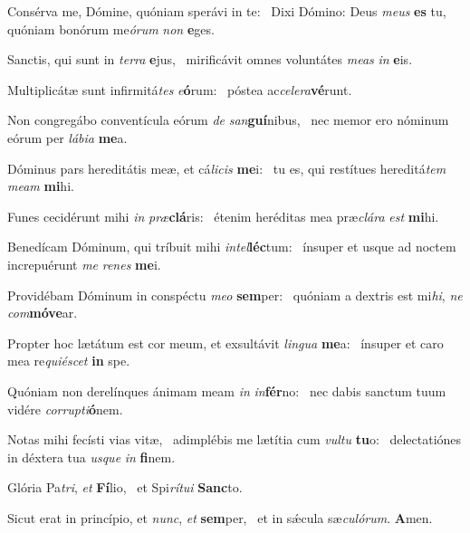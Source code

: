 \item Consérva me, Dómine, quóniam sperávi in te:~\pscross{} Dixi Dómino: Deus \textit{meus} \textbf{es} tu,~\psstar{} quóniam bonórum me\textit{órum} \textit{non} \textbf{e}ges.
\item Sanctis, qui sunt in \textit{terra} \textbf{e}jus,~\psstar{} mirificávit omnes voluntátes \textit{meas} \textit{in} \textbf{e}is.
\item Multiplicátæ sunt infirmitá\textit{tes} \textit{e}\textbf{ó}rum:~\psstar{} póstea ac\textit{celera}\textbf{vé}runt.
\item Non congregábo conventícula eórum \textit{de} \textit{san}\textbf{guí}nibus,~\psstar{} nec memor ero nóminum eórum per \textit{lábia} \textbf{me}a.
\item Dóminus pars hereditátis meæ, et cá\textit{licis} \textbf{me}i:~\psstar{} tu es, qui restítues hereditá\textit{tem} \textit{meam} \textbf{mi}hi.
\item Funes cecidérunt mihi \textit{in} \textit{præ}\textbf{clá}ris:~\psstar{} étenim heréditas mea præ\textit{clára} \textit{est} \textbf{mi}hi.
\item Benedícam Dóminum, qui tríbuit mihi \textit{intel}\textbf{léc}tum:~\psstar{} ínsuper et usque ad noctem increpuérunt \textit{me} \textit{renes} \textbf{me}i.
\item Providébam Dóminum in conspéctu \textit{meo} \textbf{sem}per:~\psstar{} quóniam a dextris est mi\textit{hi}, \textit{ne} \textit{com}\textbf{mó}\textbf{ve}ar.
\item Propter hoc lætátum est cor meum, et exsultávit \textit{lingua} \textbf{me}a:~\psstar{} ínsuper et caro mea re\textit{quiéscet} \textbf{in} spe.
\item Quóniam non derelínques ánimam meam \textit{in} \textit{in}\textbf{fér}no:~\psstar{} nec dabis sanctum tuum vidére \textit{corrupti}\textbf{ó}nem.
\item Notas mihi fecísti vias vitæ,~\pscross{} adimplébis me lætítia cum \textit{vultu} \textbf{tu}o:~\psstar{} delectatiónes in déxtera tua \textit{usque} \textit{in} \textbf{fi}nem.
\item Glória Pa\textit{tri}, \textit{et} \textbf{Fí}lio,~\psstar{} et Spi\textit{rítui} \textbf{Sanc}to.
\item Sicut erat in princípio, et \textit{nunc}, \textit{et} \textbf{sem}per,~\psstar{} et in sǽcula sæ\textit{culórum}. \textbf{A}men.
